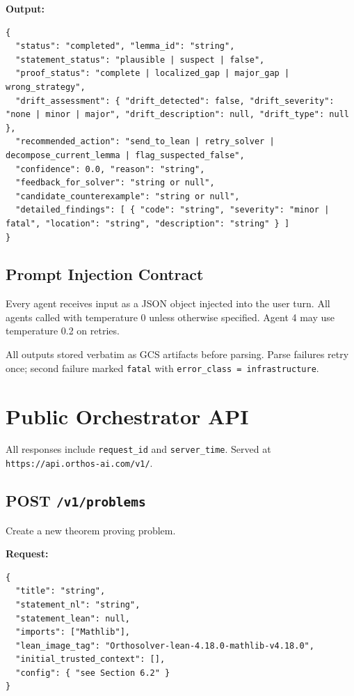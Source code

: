 \documentclass[11pt,a4paper]{article}
\begin{document}
\textbf{Output:}
\begin{lstlisting}
{
  "status": "completed", "lemma_id": "string",
  "statement_status": "plausible | suspect | false",
  "proof_status": "complete | localized_gap | major_gap | wrong_strategy",
  "drift_assessment": { "drift_detected": false, "drift_severity": "none | minor | major", "drift_description": null, "drift_type": null },
  "recommended_action": "send_to_lean | retry_solver | decompose_current_lemma | flag_suspected_false",
  "confidence": 0.0, "reason": "string",
  "feedback_for_solver": "string or null",
  "candidate_counterexample": "string or null",
  "detailed_findings": [ { "code": "string", "severity": "minor | fatal", "location": "string", "description": "string" } ]
}
\end{lstlisting}

\subsection{Prompt Injection Contract}

Every agent receives input as a JSON object injected into the user turn. All agents called with temperature 0 unless otherwise specified. Agent 4 may use temperature 0.2 on retries.

All outputs stored verbatim as GCS artifacts before parsing. Parse failures retry once; second failure marked \texttt{fatal} with \texttt{error\_class = infrastructure}.

\section{Public Orchestrator API}

All responses include \texttt{request\_id} and \texttt{server\_time}. Served at \texttt{https://api.orthos-ai.com/v1/}.

\subsection{POST \texttt{/v1/problems}}
Create a new theorem proving problem.

\textbf{Request:}
\begin{lstlisting}
{
  "title": "string",
  "statement_nl": "string",
  "statement_lean": null,
  "imports": ["Mathlib"],
  "lean_image_tag": "Orthosolver-lean-4.18.0-mathlib-v4.18.0",
  "initial_trusted_context": [],
  "config": { "see Section 6.2" }
}
\end{lstlisting}
\end{document}
